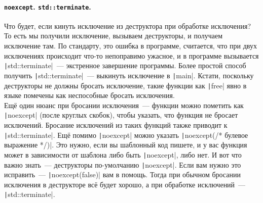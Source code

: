 \documentclass{article}
\begin{document}
    \paragraph{\texttt{noexcept}. \texttt{std::terminate}.}
    Что будет, если кинуть исключение из деструктора при обработке исключения? То есть мы получили исключение, вызываем деструкторы, и получаем исключение там. По стандарту, это ошибка в программе, считается, что при двух исключениях происходит что-то непоправимо ужасное, и в программе вызывается \texttt|std::terminate|~--- экстренное завершение программы. Более простой способ получить \texttt|std::terminate|~--- выкинуть исключение в \texttt|main|. Кстати, поскольку деструкторы не должны бросать исключение, такие функции как \texttt|free| явно в языке помечены как неспособные бросать исключения.\\
    Ещё один нюанс при бросании исключения~--- функции можно пометить как \texttt|noexcept| (после круглых скобок), чтобы указать, что функция не бросает исключений. Бросание исключений из таких функций также приводит к \texttt|std::terminate|. Ещё помимо \texttt|noexcept| можно указать \texttt|noexcept(/* булевое выражение */)|. Это нужно, если вы шаблонный код пишете, и у вас функция может в зависимости от шаблона либо быть \texttt|noexcept|, либо нет. И вот что важно знать~--- деструкторы по-умолчанию \texttt|noexcept|. Если вам нужно это исправить~--- \texttt|noexcept(false)| вам в помощь. Тогда при обычном бросании исключения в деструкторе всё будет хорошо, а при обработке исключений~--- \texttt|std::terminate|.
\end{document}
